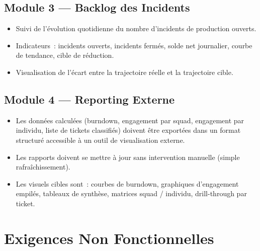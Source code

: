 \documentclass[12pt, a4paper]{article}
\begin{document}
\vspace{0.2cm}

\subsection{Module 3 — Backlog des Incidents}

\begin{itemize}[leftmargin=1.5em, itemsep=3pt]
  \item Suivi de l'évolution quotidienne du nombre d'incidents de production ouverts.
  \item Indicateurs~: incidents ouverts, incidents fermés, solde net journalier,
        courbe de tendance, cible de réduction.
  \item Visualisation de l'écart entre la trajectoire réelle et la trajectoire cible.
\end{itemize}

\vspace{0.2cm}

\subsection{Module 4 — Reporting Externe}

\begin{itemize}[leftmargin=1.5em, itemsep=3pt]
  \item Les données calculées (burndown, engagement par squad, engagement par
        individu, liste de tickets classifiés) doivent être exportées dans un
        format structuré accessible à un outil de visualisation externe.
  \item Les rapports doivent se mettre à jour sans intervention manuelle
        (simple rafraîchissement).
  \item Les visuels cibles sont~: courbes de burndown, graphiques d'engagement
        empilés, tableaux de synthèse, matrices squad / individu, drill-through
        par ticket.
\end{itemize}

\vspace{0.4cm}

\section{Exigences Non Fonctionnelles}
\end{document}
